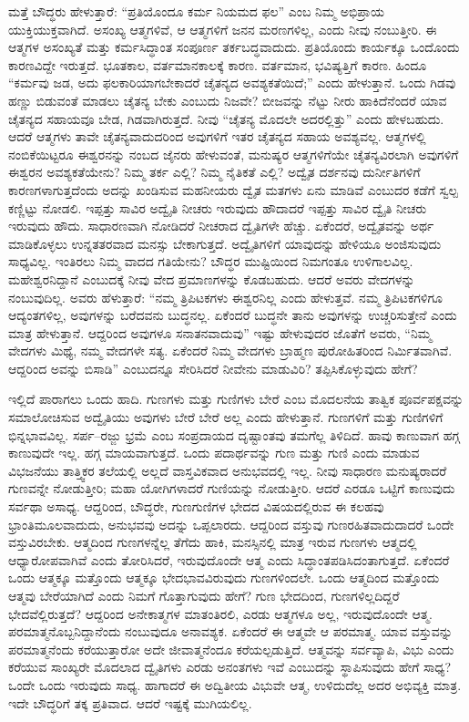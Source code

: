 ಮತ್ತೆ ಬೌದ್ಧರು ಹೇಳುತ್ತಾರೆ: “ಪ್ರತಿಯೊಂದೂ ಕರ್ಮ ನಿಯಮದ ಫಲ” ಎಂಬ ನಿಮ್ಮ ಅಭಿಪ್ರಾಯ ಯುಕ್ತಿಯುಕ್ತವಾಗಿದೆ. ಅಸಂಖ್ಯ ಆತ್ಮಗಳಿವೆ, ಆ ಆತ್ಮಗಳಿಗೆ ಜನನ ಮರಣಗಳಿಲ್ಲ, ಎಂದು ನೀವು ನಂಬುತ್ತೀರಿ. ಈ ಆತ್ಮಗಳ ಅಸಂಖ್ಯತೆ ಮತ್ತು ಕರ್ಮಸಿದ್ಧಾಂತ ಸಂಪೂರ್ಣ ತರ್ಕಬದ್ಧವಾದುದು. ಪ್ರತಿಯೊಂದು ಕಾರ್ಯಕ್ಕೂ ಒಂದೊಂದು ಕಾರಣವಿದ್ದೇ ಇರುತ್ತದೆ. ಭೂತಕಾಲ, ವರ್ತಮಾನಕಾಲಕ್ಕೆ ಕಾರಣ. ವರ್ತಮಾನ, ಭವಿಷ್ಯತ್ತಿಗೆ ಕಾರಣ. ಹಿಂದೂ “ಕರ್ಮವು ಜಡ, ಅದು ಫಲಕಾರಿಯಾಗಬೇಕಾದರೆ ಚೈತನ್ಯದ ಅವಶ್ಯಕತೆಯಿದೆ;” ಎಂದು ಹೇಳುತ್ತಾನೆ. ಒಂದು ಗಿಡವು ಹಣ್ಣು ಬಿಡುವಂತೆ ಮಾಡಲು ಚೈತನ್ಯ ಬೇಕು ಎಂಬುದು ನಿಜವೇ? ಬೀಜವನ್ನು ನೆಟ್ಟು ನೀರು ಹಾಕಿದೆನೆಂದರೆ ಯಾವ ಚೈತನ್ಯದ ಸಹಾಯವೂ ಬೇಡ, ಗಿಡವಾಗಿರುತ್ತದೆ. ನೀವು “ಚೈತನ್ಯ ಮೊದಲೇ ಅದರಲ್ಲಿತ್ತು” ಎಂದು ಹೇಳಬಹುದು. ಆದರೆ ಆತ್ಮಗಳು ತಾವೇ ಚೈತನ್ಯವಾದುದರಿಂದ ಅವುಗಳಿಗೆ ಇತರ ಚೈತನ್ಯದ ಸಹಾಯ ಅವಶ್ಯವಲ್ಲ. ಆತ್ಮಗಳಲ್ಲಿ ನಂಬಿಕೆಯಿಟ್ಟರೂ ಈಶ್ವರನನ್ನು ನಂಬದ ಜೈನರು ಹೇಳುವಂತೆ, ಮನುಷ್ಯರ ಆತ್ಮಗಳಿಗೆಯೇ ಚೈತನ್ಯವಿರಲಾಗಿ ಅವುಗಳಿಗೆ ಈಶ್ವರನ ಅವಶ್ಯಕತೆಯೇನು? ನಿಮ್ಮ ತರ್ಕ ಎಲ್ಲಿ? ನಿಮ್ಮ ನೈತಿಕತೆ ಎಲ್ಲಿ? ಅದ್ವೈತ ದರ್ಶನವು ದುರ್ನೀತಿಗಳಿಗೆ ಕಾರಣಗಳಾಗುತ್ತದೆಂದು ಅದನ್ನು ಖಂಡಿಸುವ ಮಹನೀಯರು ದ್ವೈತ ಮತಗಳು ಏನು ಮಾಡಿವೆ ಎಂಬುದರ ಕಡೆಗೆ ಸ್ವಲ್ಪ ಕಣ್ಣಿಟ್ಟು ನೋಡಲಿ. ಇಪ್ಪತ್ತು ಸಾವಿರ ಅದ್ವೈತಿ ನೀಚರು ಇರುವುದು ಹೌದಾದರೆ ಇಪ್ಪತ್ತು ಸಾವಿರ ದ್ವೈತಿ ನೀಚರು ಇರುವುದು ಹೌದು. ಸಾಧಾರಣವಾಗಿ ನೋಡಿದರೆ ನೀಚರಾದ ದ್ವೈತಿಗಳೇ ಹೆಚ್ಚು. ಏಕೆಂದರೆ, ಅದ್ವೈತವನ್ನು ಅರ್ಥ ಮಾಡಿಕೊಳ್ಳಲು ಉನ್ನತತರವಾದ ಮನಸ್ಸು ಬೇಕಾಗುತ್ತದೆ. ಅದ್ವೈತಿಗಳಿಗೆ ಯಾವುದನ್ನು ಹೇಳಿಯೂ ಅಂಜಿಸುವುದು ಸಾಧ್ಯವಿಲ್ಲ. ಇಂತಿರಲು ನಿಮ್ಮ ವಾದದ ಗತಿಯೇನು? ಬೌದ್ಧರ ಮುಷ್ಟಿಯಿಂದ ನಿಮಗಂತೂ ಉಳಿಗಾಲವಿಲ್ಲ. ಮಹೇಶ್ವರನಿದ್ದಾನೆ ಎಂಬುದಕ್ಕೆ ನೀವು ವೇದ ಪ್ರಮಾಣಗಳನ್ನು ಕೊಡಬಹುದು. ಆದರೆ ಅವರು ವೇದಗಳನ್ನು ನಂಬುವುದಿಲ್ಲ. ಅವರು ಹೆಳುತ್ತಾರೆ: “ನಮ್ಮ ತ್ರಿಪಿಟಕಗಳು ಈಶ್ವರನಿಲ್ಲ ಎಂದು ಹೇಳುತ್ತವೆ. ನಮ್ಮ ತ್ರಿಪಿಟಕಗಳಿಗೂ ಆದ್ಯಂತಗಳಿಲ್ಲ, ಅವುಗಳನ್ನು ಬರೆದವನು ಬುದ್ಧನಲ್ಲ. ಏಕೆಂದರೆ ಬುದ್ಧನೇ ತಾನು ಅವುಗಳನ್ನು ಉಚ್ಚರಿಸುತ್ತೇನೆ ಎಂದು ಮಾತ್ರ ಹೇಳುತ್ತಾನೆ. ಆದ್ದರಿಂದ ಅವುಗಳೂ ಸನಾತನವಾದುವು” ಇಷ್ಟು ಹೇಳುವುದರ ಜೊತೆಗೆ ಅವರು, “ನಿಮ್ಮ ವೇದಗಳು ಮಿಥ್ಯೆ, ನಮ್ಮ ವೇದಗಳೇ ಸತ್ಯ. ಏಕೆಂದರೆ ನಿಮ್ಮ ವೇದಗಳು ಬ್ರಾಹ್ಮಣ ಪುರೋಹಿತರಿಂದ ನಿರ್ಮಿತವಾಗಿವೆ. ಆದ್ದರಿಂದ ಅವನ್ನು ಬಿಸಾಡಿ” ಎಂಬುದನ್ನೂ ಸೇರಿಸಿದರೆ ನೀವೇನು ಮಾಡುವಿರಿ? ತಪ್ಪಿಸಿಕೊಳ್ಳುವುದು ಹೇಗೆ?

ಇಲ್ಲಿದೆ ಪಾರಾಗಲು ಒಂದು ಹಾದಿ. ಗುಣಗಳು ಮತ್ತು ಗುಣಿಗಳು ಬೇರೆ ಎಂಬ ಮೊದಲನೆಯ ತಾತ್ವಿಕ ಪೂರ್ವಪಕ್ಷವನ್ನು ಸಮಾಲೋಚಿಸುವ ಅದ್ವೈತಿಯು ಅವುಗಳು ಬೇರೆ ಬೇರೆ ಅಲ್ಲ ಎಂದು ಹೇಳುತ್ತಾನೆ. ಗುಣಗಳಿಗೆ ಮತ್ತು ಗುಣಿಗಳಿಗೆ ಭಿನ್ನಭಾವವಿಲ್ಲ. ಸರ್ಪ–ರಜ್ಜು ಭ್ರಮೆ ಎಂಬ ಸಂಪ್ರದಾಯದ ದೃಷ್ಟಾಂತವು ತಮಗೆಲ್ಲ ತಿಳಿದಿದೆ. ಹಾವು ಕಾಣುವಾಗ ಹಗ್ಗ ಕಾಣುವುದೇ ಇಲ್ಲ. ಹಗ್ಗ ಮಾಯವಾಗುತ್ತದೆ. ಒಂದು ಪದಾರ್ಥವನ್ನು ಗುಣ ಮತ್ತು ಗುಣಿ ಎಂದು ಮಾಡುವ ವಿಭಜನೆಯು ತಾತ್ತ್ವಿಕರ ತಲೆಯಲ್ಲಿ ಅಲ್ಲದೆ ವಾಸ್ತವಿಕವಾದ ಅನುಭವದಲ್ಲಿ ಇಲ್ಲ. ನೀವು ಸಾಧಾರಣ ಮನುಷ್ಯರಾದರೆ ಗುಣವನ್ನೇ ನೋಡುತ್ತೀರಿ; ಮಹಾ ಯೋಗಿಗಳಾದರೆ ಗುಣಿಯನ್ನು ನೋಡುತ್ತೀರಿ. ಆದರೆ ಎರಡೂ ಒಟ್ಟಿಗೆ ಕಾಣುವುದು ಸರ್ವಥಾ ಅಸಾಧ್ಯ. ಆದ್ದರಿಂದ, ಬೌದ್ಧರೇ, ಗುಣಗುಣಿಗಳ ಭೇದದ ವಿಷಯದಲ್ಲಿರುವ ಈ ಕಲಹವು ಭ್ರಾಂತಿಮೂಲವಾದುದು, ಅನುಭವವು ಅದನ್ನು ಒಪ್ಪಲಾರದು. ಆದ್ದರಿಂದ ವಸ್ತುವು ಗುಣರಹಿತವಾದುದಾದರೆ ಒಂದೇ ವಸ್ತುವಿರಬೇಕು. ಆತ್ಮದಿಂದ ಗುಣಗಳನ್ನೆಲ್ಲ ತೆಗೆದು ಹಾಕಿ, ಮನಸ್ಸಿನಲ್ಲಿ ಮಾತ್ರ ಇರುವ ಗುಣಗಳು ಆತ್ಮದಲ್ಲಿ ಆಧ್ಯಾರೋಪವಾಗಿವೆ ಎಂದು ತೋರಿಸಿದರೆ, ಇರುವುದೊಂದೇ ಆತ್ಮ ಎಂದು ಸಿದ್ಧಾಂತಪಡಿಸಿದಂತಾಗುತ್ತದೆ. ಏಕೆಂದರೆ ಒಂದು ಆತ್ಮಕ್ಕೂ ಮತ್ತೊಂದು ಆತ್ಮಕ್ಕೂ ಭೇದಭಾವವಿರುವುದು ಗುಣಗಳಿಂದಲೇ. ಒಂದು ಆತ್ಮದಿಂದ ಮತ್ತೊಂದು ಆತ್ಮವು ಬೇರೆಯಾಗಿದೆ ಎಂದು ನಿಮಗೆ ಗೊತ್ತಾಗುವುದು ಹೇಗೆ? ಗುಣ ಭೇದದಿಂದ, ಗುಣಗಳಿಲ್ಲದಿದ್ದರೆ ಭೇದವೆಲ್ಲಿರುತ್ತದೆ? ಆದ್ದರಿಂದ ಅನೇಕಾತ್ಮಗಳ ಮಾತಂತಿರಲಿ, ಎರಡು ಆತ್ಮಗಳೂ ಅಲ್ಲ, ಇರುವುದೊಂದೇ ಆತ್ಮ. ಪರಮಾತ್ಮನೊಬ್ಬನಿದ್ದಾನೆಂದು ನಂಬುವುದೂ ಅನಾವಶ್ಯಕ. ಏಕೆಂದರೆ ಈ ಆತ್ಮವೇ ಆ ಪರಮಾತ್ಮ. ಯಾವ ವಸ್ತುವನ್ನು ಪರಮಾತ್ಮನೆಂದು ಕರೆಯುತ್ತಾರೋ ಅದೇ ಜೀವಾತ್ಮನೆಂದೂ ಕರೆಯಲ್ಪಡುತ್ತಿದೆ. ಆತ್ಮವನ್ನು ಸರ್ವವ್ಯಾಪಿ, ವಿಭು ಎಂದು ಕರೆಯುವ ಸಾಂಖ್ಯರೇ ಮೊದಲಾದ ದ್ವೈತಿಗಳು ಎರಡು ಅನಂತಗಳು ಇವೆ ಎಂಬುದನ್ನು ಸ್ಥಾಪಿಸುವುದು ಹೇಗೆ ಸಾಧ್ಯ? ಒಂದೇ ಒಂದು ಇರುವುದು ಸಾಧ್ಯ. ಹಾಗಾದರೆ ಈ ಅದ್ವಿತೀಯ ವಿಭುವೇ ಆತ್ಮ, ಉಳಿದುದೆಲ್ಲ ಅದರ ಅಭಿವ್ಯಕ್ತಿ ಮಾತ್ರ. ಇದೇ ಬೌದ್ಧರಿಗೆ ತಕ್ಕ ಪ್ರತಿವಾದ. ಆದರೆ ಇಷ್ಟಕ್ಕೆ ಮುಗಿಯಲಿಲ್ಲ.


